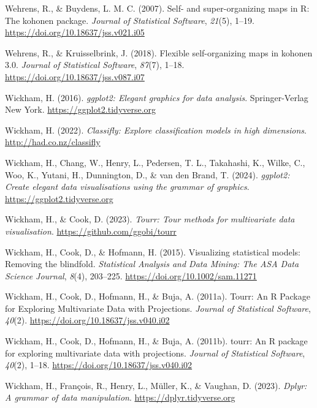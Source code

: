\documentclass[
  letterpaper,
]{krantz}
\newlength{\cslhangindent}
\newenvironment{CSLReferences}[2] %
 {\begin{list}{}{%
  \setlength{\itemindent}{0pt}
  \setlength{\leftmargin}{0pt}
  \setlength{\parsep}{0pt}
  \ifodd #1
   \setlength{\leftmargin}{\cslhangindent}
   \setlength{\itemindent}{-1\cslhangindent}
  \fi
  \setlength{\itemsep}{#2\baselineskip}}}
 {\end{list}}
\begin{document}
\begin{CSLReferences}{1}{0}
Wehrens, R., \& Buydens, L. M. C. (2007). Self- and super-organizing
maps in {R}: The {kohonen} package. \emph{Journal of Statistical
Software}, \emph{21}(5), 1--19.
\url{https://doi.org/10.18637/jss.v021.i05}

Wehrens, R., \& Kruisselbrink, J. (2018). Flexible self-organizing maps
in {kohonen} 3.0. \emph{Journal of Statistical Software}, \emph{87}(7),
1--18. \url{https://doi.org/10.18637/jss.v087.i07}

Wickham, H. (2016). \emph{ggplot2: Elegant graphics for data analysis}.
Springer-Verlag New York. \url{https://ggplot2.tidyverse.org}

Wickham, H. (2022). \emph{Classifly: Explore classification models in
high dimensions}. \url{http://had.co.nz/classifly}

Wickham, H., Chang, W., Henry, L., Pedersen, T. L., Takahashi, K.,
Wilke, C., Woo, K., Yutani, H., Dunnington, D., \& van den Brand, T.
(2024). \emph{ggplot2: Create elegant data visualisations using the
grammar of graphics}. \url{https://ggplot2.tidyverse.org}

Wickham, H., \& Cook, D. (2023). \emph{Tourr: Tour methods for
multivariate data visualisation}. \url{https://github.com/ggobi/tourr}

Wickham, H., Cook, D., \& Hofmann, H. (2015). Visualizing statistical
models: Removing the blindfold. \emph{Statistical Analysis and Data
Mining: The ASA Data Science Journal}, \emph{8}(4), 203--225.
\url{https://doi.org/10.1002/sam.11271}

Wickham, H., Cook, D., Hofmann, H., \& Buja, A. (2011a). Tourr: {An} {R}
{Package} for {Exploring} {Multivariate} {Data} with {Projections}.
\emph{Journal of Statistical Software}, \emph{40}(2).
\url{https://doi.org/10.18637/jss.v040.i02}

Wickham, H., Cook, D., Hofmann, H., \& Buja, A. (2011b). {tourr}: An {R}
package for exploring multivariate data with projections. \emph{Journal
of Statistical Software}, \emph{40}(2), 1--18.
\url{https://doi.org/10.18637/jss.v040.i02}

Wickham, H., François, R., Henry, L., Müller, K., \& Vaughan, D. (2023).
\emph{Dplyr: A grammar of data manipulation}.
\url{https://dplyr.tidyverse.org}


\end{CSLReferences}
\end{document}
